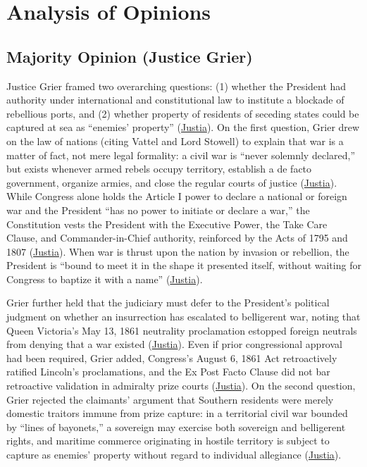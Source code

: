 \documentclass[12pt]{article}
\begin{document}
\section{Analysis of Opinions}

\subsection{Majority Opinion (Justice Grier)}

Justice Grier framed two overarching questions: (1) whether the President had authority under international and constitutional law to institute a blockade of rebellious ports, and (2) whether property of residents of seceding states could be captured at sea as ``enemies' property'' (\href{https://supreme.justia.com/cases/federal/us/67/635/}{Justia}). On the first question, Grier drew on the law of nations (citing Vattel and Lord Stowell) to explain that war is a matter of fact, not mere legal formality: a civil war is ``never solemnly declared,'' but exists whenever armed rebels occupy territory, establish a de facto government, organize armies, and close the regular courts of justice (\href{https://supreme.justia.com/cases/federal/us/67/635/}{Justia}). While Congress alone holds the Article I power to declare a national or foreign war and the President ``has no power to initiate or declare a war,'' the Constitution vests the President with the Executive Power, the Take Care Clause, and Commander-in-Chief authority, reinforced by the Acts of 1795 and 1807 (\href{https://supreme.justia.com/cases/federal/us/67/635/}{Justia}). When war is thrust upon the nation by invasion or rebellion, the President is ``bound to meet it in the shape it presented itself, without waiting for Congress to baptize it with a name'' (\href{https://supreme.justia.com/cases/federal/us/67/635/}{Justia}).

Grier further held that the judiciary must defer to the President's political judgment on whether an insurrection has escalated to belligerent war, noting that Queen Victoria's May 13, 1861 neutrality proclamation estopped foreign neutrals from denying that a war existed (\href{https://supreme.justia.com/cases/federal/us/67/635/}{Justia}). Even if prior congressional approval had been required, Grier added, Congress's August 6, 1861 Act retroactively ratified Lincoln's proclamations, and the Ex Post Facto Clause did not bar retroactive validation in admiralty prize courts (\href{https://supreme.justia.com/cases/federal/us/67/635/}{Justia}). On the second question, Grier rejected the claimants' argument that Southern residents were merely domestic traitors immune from prize capture: in a territorial civil war bounded by ``lines of bayonets,'' a sovereign may exercise both sovereign and belligerent rights, and maritime commerce originating in hostile territory is subject to capture as enemies' property without regard to individual allegiance (\href{https://supreme.justia.com/cases/federal/us/67/635/}{Justia}).
\end{document}
